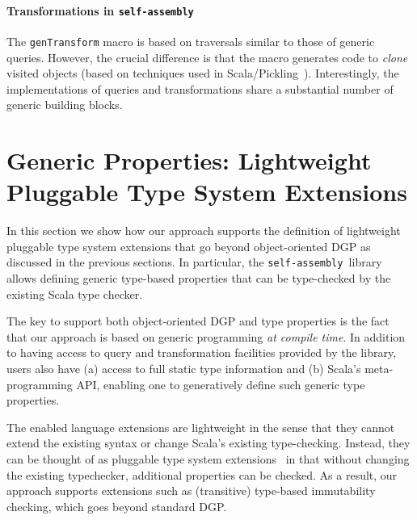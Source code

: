 \documentclass[preprint,nocopyrightspace]{sigplanconf}
\newcommand{\selfassembly}{\texttt{self-assembly~}}
\begin{document}
\paragraph{Transformations in \selfassembly}
The \verb|genTransform| macro is based on traversals similar to those of
generic queries. However, the crucial difference is that the macro generates
code to {\em clone} visited objects (based on techniques used in
Scala/Pickling~\cite{Pickling}). Interestingly, the implementations of queries and
transformations share a substantial number of generic building blocks.


\section{Generic Properties: Lightweight Pluggable Type System Extensions}
\label{sec:language-extensions}

In this section we show how our approach supports the definition of
lightweight pluggable type system extensions that go beyond object-oriented DGP as
discussed in the previous sections. In particular, the \selfassembly library
allows defining generic type-based properties that can be type-checked by the
existing Scala type checker.


The key to support both object-oriented DGP and type properties is the fact
that our approach is based on generic programming {\em at compile time}. In
addition to having access to query and transformation facilities provided by
the library, users also have (a) access to full static type information and
(b) Scala's meta-programming API, enabling one to generatively define such
generic type properties.

The enabled language extensions are lightweight in the sense that they cannot
extend the existing syntax or change Scala's existing type-checking. Instead,
they can be thought of as pluggable type system
extensions~\cite{PluggableTypes} in that without changing the existing
typechecker, additional properties can be checked. As a result, our approach
supports extensions such as (transitive) type-based immutability checking,
which goes beyond standard DGP.
\end{document}
